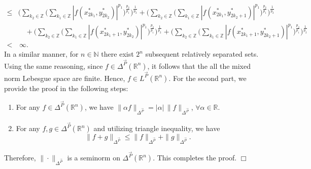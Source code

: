 \documentclass[11pt, a4paper]{article}
\theoremstyle{definition}
\newcommand{\qedwhite}{\hfill \ensuremath{\Box}}
\renewenvironment{proof}{{\raggedright \bfseries Proof.}}{\qedwhite}
\numberwithin{equation}{section}
\def\NN{\mathbb N}
\def\RR{\mathbb R}
\newcommand{\vc}[1]{\overrightarrow{#1}}
\begin{document}
\begin{proof}
\begin{align*}
        \leq& \Bigg( \sum_{k_2 \in \mathbb{Z}}\Bigg(\sum_{k_1 \in \mathbb{Z}}  |f(x_{2k_1}^*, y_{2k_2}^*)|^{p_1} \Bigg)^{\frac{p_2}{p_1}}\Bigg)^{\frac{1}{p_2}} + \Bigg(\sum_{k_2 \in \mathbb{Z}}\Bigg(\sum_{k_1 \in \mathbb{Z}}   |f(x_{2k_1}^*, y_{2k_2+1}^*)|^{p_1} \Bigg)^{\frac{p_2}{p_1}}\Bigg)^{\frac{1}{p_2}} \\
        &\quad + \Bigg(\sum_{k_2 \in \mathbb{Z}} \Bigg( \sum_{k_1 \in \mathbb{Z}} |f(x_{2k_1+1}^*, y_{2k_2}^*)|^{p_1} \Bigg)^{\frac{p_2}{p_1}}\Bigg)^{\frac{1}{p_2}} + \Bigg( \sum_{k_2 \in \mathbb{Z}}\Bigg(\sum_{k_1 \in \mathbb{Z}}  |f(x_{2k_1+1}^*, y_{2k_2+1}^*)|^{p_1} \Bigg)^{\frac{p_2}{p_1}}\Bigg)^{\frac{1}{p_2}}\\
        <&\, \infty.
    \end{align*}
    In a similar manner, for $n\in \NN$ there exist $2^n$ subsequent relatively separated sets. Using the same reasoning, since  $f\in \Delta^{\vc{P}}(\RR^n)$, it follows that the all the mixed norm Lebesgue space are finite. Hence, $f\in L^{\vc{P}}(\RR^n)$. 
    For the second part, we provide the proof in the following steps:
    \begin{enumerate}[label=(\roman*), left=0pt]

        \item For any $f\in \Delta^{\vc{P}}(\RR^n)$, we have 
        $\|\alpha f\|_{\Delta^{\vc{P}}}= |\alpha|  \hspace{2pt} \|f\|_{\Delta^{\vc{P}}}$,  
        $ \forall \alpha \in \RR$. 
        
        \item For any $f, g\in \Delta^{\vc{P}}(\RR^n)$ and utilizing triangle inequality, we have 
        $$\|f+g\|_{\Delta^{\vc{P}}} \leq \|f\|_{\Delta^{\vc{P}}}+\|g\|_{\Delta^{\vc{P}}}.$$
    \end{enumerate}
    Therefore, $\|\cdot\|_{\Delta^{\vc{P}}} $ is a seminorm on $\Delta^{\vc{P}}(\RR^n)$. This completes the proof.
\end{proof}
\end{document}
